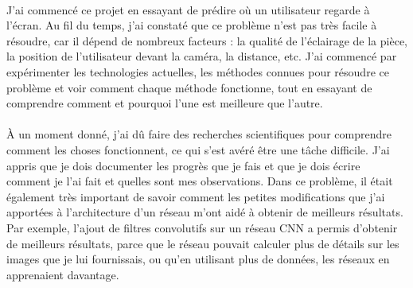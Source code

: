\paragraph{}
J'ai commencé ce projet en essayant de prédire où un utilisateur regarde à l'écran.
Au fil du temps, j'ai constaté que ce problème n'est pas très facile à résoudre, car il dépend de nombreux facteurs : la qualité de l'éclairage de la pièce, la position de l'utilisateur devant la caméra, la distance, etc.
J'ai commencé par expérimenter les technologies actuelles, les méthodes connues pour résoudre ce problème et voir comment chaque méthode fonctionne, tout en essayant de comprendre comment et pourquoi l'une est meilleure que l'autre.


\paragraph{}
À un moment donné, j'ai dû faire des recherches scientifiques pour comprendre comment les choses fonctionnent, ce qui s'est avéré être une tâche difficile.
J'ai appris que je dois documenter les progrès que je fais et que je dois écrire comment je l'ai fait et quelles sont mes observations.
Dans ce problème, il était également très important de savoir comment les petites modifications que j'ai apportées à l'architecture d'un réseau m'ont aidé à obtenir de meilleurs résultats.
Par exemple, l'ajout de filtres convolutifs sur un réseau CNN a permis d'obtenir de meilleurs résultats, parce que le réseau pouvait calculer plus de détails sur les images que je lui fournissais, ou qu'en utilisant plus de données, les réseaux en apprenaient davantage.


